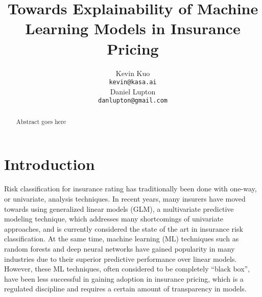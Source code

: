 \documentclass{article}
\title{Towards Explainability of Machine Learning Models in Insurance Pricing}
\author{
 Kevin Kuo \\
  \texttt{kevin@kasa.ai} \\
   \And
 Daniel Lupton \\
  \texttt{danlupton@gmail.com} \\
}
\begin{document}
\maketitle

\begin{abstract}
Abstract goes here
\end{abstract}

\section{Introduction}
Risk classification for insurance rating has traditionally been done with one-way, or univariate, analysis techniques. In recent years, many insurers have moved towards using generalized linear models (GLM), a multivariate predictive modeling technique, which addresses many shortcomings of univariate approaches, and is currently considered the state of the art in insurance risk classification. At the same time, machine learning (ML) techniques such as random forests and deep neural networks have gained popularity in many industries due to their superior predictive performance over linear models. However, these ML techniques, often considered to be completely “black box”, have been less successful in gaining adoption in insurance pricing, which is a regulated discipline and requires a certain amount of transparency in models.
\end{document}

